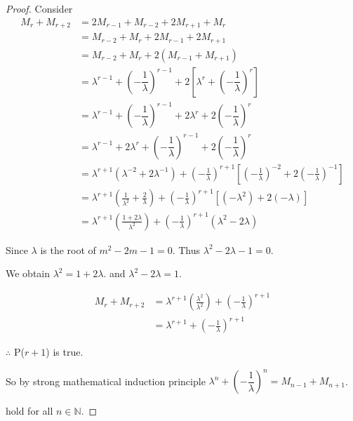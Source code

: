 \documentclass{rmutt-seminar}
\begin{document}
\begin{proof}
\quad \quad \quad Consider
\begin{align*}
	M_{r} + M_{r+2} &= 2M_{r-1} + M_{r-2} + 2M_{r+1} + M_r \\
	&= M_{r-2} + M_r + 2M_{r-1} + 2M_{r+1} \\ 
	&= M_{r-2} + M_r + 2(M_{r-1} + M_{r+1}) \\
	&= \lambda^{r-1} + \left(-\dfrac{1}{\lambda}\right)^{r-1} +2\left[\lambda^{r} + \left(-\dfrac{1}{\lambda}\right)^{r}\right] \\
	&= \lambda^{r-1} + \left(-\dfrac{1}{\lambda}\right)^{r-1} +2\lambda^{r} + 2\left(-\dfrac{1}{\lambda}\right)^{r}\ \\
	&= \lambda^{r-1}+2\lambda^{r}  + \left(-\dfrac{1}{\lambda}\right)^{r-1} + 2\left(-\dfrac{1}{\lambda}\right)^{r}\ \\
	&= \lambda^{r+1}(\lambda^{-2} + 2\lambda^{-1}) + \left(-\frac{1}{\lambda}\right)^{r+1} \left[ \left(-\frac{1}{\lambda}\right)^{-2} + 2\left(-\frac{1}{\lambda}\right)^{-1}\right] \\
	&= \lambda^{r+1} \left(\frac{1}{\lambda^2} + \frac{2}{\lambda}\right) + \left(-\frac{1}{\lambda}\right)^{r+1}[(-\lambda^2)+2(-\lambda)] \\
	&= \lambda^{r+1}\left(\frac{1+2\lambda}{\lambda^2}\right)+\left(-\frac{1}{\lambda}\right)^{r+1}(\lambda^2-2\lambda)
\end{align*}

\quad \quad \quad Since $\lambda$ is the root of $m^2 -2m -1 =0$. Thus $\lambda^2-2\lambda-1=0$.
 
\quad \quad \quad  We obtain $\lambda^2=1+2\lambda$. and $\lambda^2-2\lambda=1$.
 
 \begin{align*}
 M_{r} + M_{r+2} &= \lambda^{r+1}\left(\frac{\lambda^2}{\lambda^2}\right)+\left(-\frac{1}{\lambda}\right)^{r+1} \\
 &= \lambda^{r+1}+\left(-\frac{1}{\lambda}\right)^{r+1}
 \end{align*}	
 
 \quad \quad \quad $\therefore$ P($r+1$) is true.
 
 \quad \quad \quad So by strong mathematical induction principle $\lambda^n + \left(-\dfrac{1}{\lambda}\right)^n = M_{n-1} + M_{n+1}$. 
 
 \quad \quad \quad hold for all $n \in \mathbb{N}$.
\end{proof}
\end{document}
